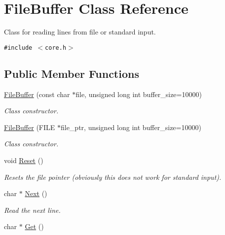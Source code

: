 \hypertarget{classFileBuffer}{
\section{FileBuffer Class Reference}
\label{classFileBuffer}
}
Class for reading lines from file or standard input.  


{\tt \#include $<$core.h$>$}

\subsection*{Public Member Functions}
\begin{CompactItemize}
\item 
\hyperlink{classFileBuffer_8dfee67d26ddebb474edd7676f4bdf3d}{FileBuffer} (const char $\ast$file, unsigned long int buffer\_\-size=10000)
\begin{CompactList}\small\item\em Class constructor. \item\end{CompactList}\item 
\hyperlink{classFileBuffer_490eb6dcf60d7c804ad677035e38db40}{FileBuffer} (FILE $\ast$file\_\-ptr, unsigned long int buffer\_\-size=10000)
\begin{CompactList}\small\item\em Class constructor. \item\end{CompactList}\item 
\hypertarget{classFileBuffer_108373797a1626a0ac478fefe881535e}{
void \hyperlink{classFileBuffer_108373797a1626a0ac478fefe881535e}{Reset} ()}
\label{classFileBuffer_108373797a1626a0ac478fefe881535e}

\begin{CompactList}\small\item\em Resets the file pointer (obviously this does not work for standard input). \item\end{CompactList}\item 
\hypertarget{classFileBuffer_121e4400d297944b8c241b90ab70fa3a}{
char $\ast$ \hyperlink{classFileBuffer_121e4400d297944b8c241b90ab70fa3a}{Next} ()}
\label{classFileBuffer_121e4400d297944b8c241b90ab70fa3a}

\begin{CompactList}\small\item\em Read the next line. \item\end{CompactList}\item 
\hypertarget{classFileBuffer_48bf46db592b676a68cc33dc10a0e272}{
char $\ast$ \hyperlink{classFileBuffer_48bf46db592b676a68cc33dc10a0e272}{Get} ()}
\label{classFileBuffer_48bf46db592b676a68cc33dc10a0e272}


\end{CompactItemize}
